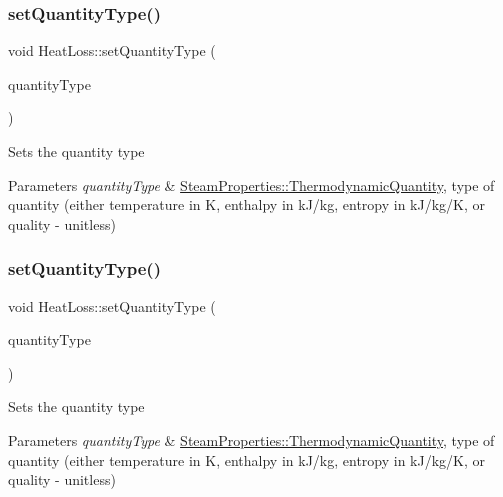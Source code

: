 \subsubsection{\texorpdfstring{set\+Quantity\+Type()}{setQuantityType()}\hspace{0.1cm}{\footnotesize\ttfamily [2/3]}}
{\footnotesize\ttfamily void Heat\+Loss\+::set\+Quantity\+Type (\begin{DoxyParamCaption}\item[{\hyperlink{class_steam_properties_ae0294bedf7d178c2d8fb6aed0f62fbff}{Steam\+Properties\+::\+Thermodynamic\+Quantity}}]{quantity\+Type }\end{DoxyParamCaption})}

Sets the quantity type 
\begin{DoxyParams}{Parameters}
{\em quantity\+Type} & \hyperlink{class_steam_properties_ae0294bedf7d178c2d8fb6aed0f62fbff}{Steam\+Properties\+::\+Thermodynamic\+Quantity}, type of quantity (either temperature in K, enthalpy in k\+J/kg, entropy in k\+J/kg/K, or quality -\/ unitless) \\
\hline
\end{DoxyParams}
\mbox{\label{class_heat_loss_a7c125f1137f31eba8826a1aa3b905290}} 
\subsubsection{\texorpdfstring{set\+Quantity\+Type()}{setQuantityType()}\hspace{0.1cm}{\footnotesize\ttfamily [3/3]}}
{\footnotesize\ttfamily void Heat\+Loss\+::set\+Quantity\+Type (\begin{DoxyParamCaption}\item[{\hyperlink{class_steam_properties_ae0294bedf7d178c2d8fb6aed0f62fbff}{Steam\+Properties\+::\+Thermodynamic\+Quantity}}]{quantity\+Type }\end{DoxyParamCaption})}

Sets the quantity type 
\begin{DoxyParams}{Parameters}
{\em quantity\+Type} & \hyperlink{class_steam_properties_ae0294bedf7d178c2d8fb6aed0f62fbff}{Steam\+Properties\+::\+Thermodynamic\+Quantity}, type of quantity (either temperature in K, enthalpy in k\+J/kg, entropy in k\+J/kg/K, or quality -\/ unitless) \\
\hline
\end{DoxyParams}


